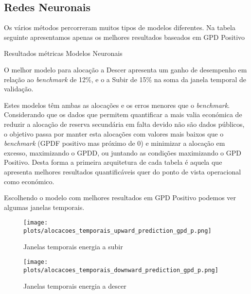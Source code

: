 \subsection{Redes Neuronais \label{se:resml}}

Os vários métodos percorreram muitos tipos de modelos diferentes. Na tabela seguinte apresentamos apenas os melhores resultados baseados em GPD Positivo\par


\begin{table}[H]
    \caption{Resultados métricas Modelos Neuronais}    
    \resizebox{\linewidth}{!}{}
    \label{tab:mlresmetrics}
    \end{table}

O melhor modelo para alocação a Descer apresenta um ganho de desempenho em relação ao \textit{benchmark} de 12\%, e o a Subir de 15\% na soma da janela temporal de validação.\par
Estes modelos têm ambas as alocações e os erros menores que o \textit{benchmark}. Considerando que os dados que permitem quantificar a mais valia económica de reduzir a alocação de reserva secundária em falta devido não são dados públicos, o objetivo passa por manter esta alocações com valores mais baixos que o \textit{benchmark} (GPDF positivo mas próximo de 0) e minimizar a alocação em excesso, maximizando o GPDD, ou juntando as condições maximizando o GPD Positivo. Desta forma a primeira arquitetura de cada tabela é aquela que apresenta melhores resultados quantificáveis quer do ponto de vista operacional como económico.\par
Escolhendo o modelo com melhores resultados em GPD Positivo podemos ver algumas janelas temporais.\par


\begin{figure}[H]
    \centering
    \texttt{[image: plots/alocacoes\_temporais\_upward\_prediction\_gpd\_p.png]}
    \caption{Janelas temporais energia a subir}
    \label{fig:mltimewindowsup}
\end{figure}


\begin{figure}[H]
    \centering
    \texttt{[image: plots/alocacoes\_temporais\_downward\_prediction\_gpd\_p.png]}
    \caption{Janelas temporais energia a descer}
    \label{fig:mltimewindowsdown}
\end{figure}

